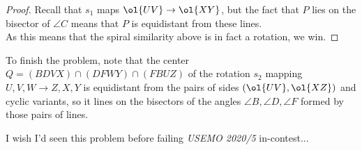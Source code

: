 \documentclass{seto}
\begin{document}
\begin{proof} Recall that $s_1$ maps $\ol{UV}\to\ol{XY}$, but the fact that $P$
lies on the bisector of $\angle C$ means that $P$ is equidistant from these
lines.\\ 
As this means that the spiral similarity above is in fact a rotation, we
win.\end{proof} To finish the problem, note that the center
$Q=(BDVX)\cap(DFWY)\cap(FBUZ)$ of the rotation $s_2$ mapping $U,V,W\to Z,X,Y$ is
equidistant from the pairs of sides $(\ol{UV},\ol{XZ})$ and cyclic variants, so
it lines on the bisectors of the angles $\angle B,\angle D,\angle F$ formed by
those pairs of lines. 
\begin{remark}I wish I'd seen this problem before failing \emph{USEMO 2020/5} in-contest...\end{remark} 
\end{document}
